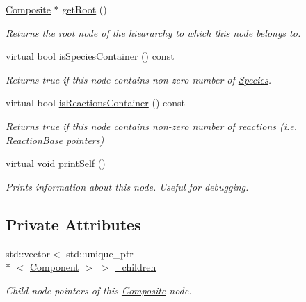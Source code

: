 \begin{DoxyCompactItemize}
\hyperlink{classchem_1_1Composite}{Composite} $\ast$ \hyperlink{classchem_1_1Component_a7f1166f8fb4c9526cd1794ec3c2714f5}{get\-Root} ()
\begin{DoxyCompactList}\small\item\em Returns the root node of the hieararchy to which this node belongs to. \end{DoxyCompactList}\item 
virtual bool \hyperlink{classchem_1_1Component_a3c0f652fe5b6910f07c046fe0190b7b5}{is\-Species\-Container} () const 
\begin{DoxyCompactList}\small\item\em Returns true if this node contains non-\/zero number of \hyperlink{classchem_1_1Species}{Species}. \end{DoxyCompactList}\item 
virtual bool \hyperlink{classchem_1_1Component_a8c79ee4335fadfcef56b14a62b742457}{is\-Reactions\-Container} () const 
\begin{DoxyCompactList}\small\item\em Returns true if this node contains non-\/zero number of reactions (i.\-e. \hyperlink{classchem_1_1ReactionBase}{Reaction\-Base} pointers) \end{DoxyCompactList}\item 
virtual void \hyperlink{classchem_1_1Component_a778911b6f9505f1d8a39fc39e093974e}{print\-Self} ()
\begin{DoxyCompactList}\small\item\em Prints information about this node. Useful for debugging. \end{DoxyCompactList}\end{DoxyCompactItemize}
\subsection*{Private Attributes}
\begin{DoxyCompactItemize}
\item 
std\-::vector$<$ std\-::unique\-\_\-ptr\\*
$<$ \hyperlink{classchem_1_1Component}{Component} $>$ $>$ \hyperlink{classchem_1_1Composite_a80fea5cefad1820315fbef6f8d7adf17}{\-\_\-children}
\begin{DoxyCompactList}\small\item\em Child node pointers of this \hyperlink{classchem_1_1Composite}{Composite} node. \end{DoxyCompactList}\end{DoxyCompactItemize}


